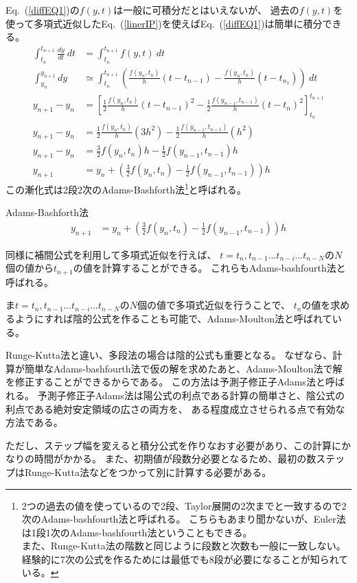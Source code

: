 \documentclass[autodetect-engine,dvipdfmx-if-dvi,ja=standard,a4paper,layout=v2]{bxjsreport}
\newcommand{\eref}[1]{Eq.~(\ref{#1})}
\begin{document}
    \eref{diffEQ1}の$f(y,t)$は一般に可積分だとはいえないが、
    過去の$f(y,t)$を使って多項式近似した\eref{linerIP}を使えば\eref{diffEQ1}は簡単に積分できる。
    \begin{align}
      \int^{t_{n+1}}_{t_n}\frac{dy}{dt}\:dt &= \int^{t_{n+1}}_{t_n}f(y, t)\: dt \nonumber\\
      \int^{y_{n+1}}_{y_n}dy &\simeq \int^{t_{n+1}}_{t_n}\left(\frac{f(y_n,t_n)}{h}(t-t_{n-1}) -
      \frac{f(y_n, t_n)}{h}(t-t_{n_1})\right)\:dt\nonumber\\
      y_{n+1}-y_n &= \left[\frac{1}{2}\frac{f(y_n,t_n)}{h}(t-t_{n-1})^2 -
      \frac{1}{2}\frac{f(y_{n-1}, t_{n-1})}{h}(t-t_{n})^2\right]^{t_{n+1}}_{t_n} \nonumber\\
      y_{n+1}-y_n &=  \frac{1}{2}\frac{f(y_n,t_n)}{h}(3h^2) - \frac{1}{2}\frac{f(y_{n-1}, t_{n-1})}{h}(h^2)\nonumber\\
      y_{n+1}-y_n &=  \frac{3}{2}f(y_n,t_n)h - \frac{1}{2}f(y_{n-1}, t_{n-1})h\nonumber\\
      y_{n+1} &= y_n + \left(\frac{3}{2}f(y_n,t_n) - \frac{1}{2}f(y_{n-1},t_{n-1})\right)h
    \end{align}
    この漸化式は2段2次のAdams-Bashforth法\footnote{
      2つの過去の値を使っているので2段、Taylor展開の2次までと一致するので2次のAdams-bashfourth法と呼ばれる。
      こちらもあまり聞かないが、Euler法は1段1次のAdams-bashfourth法ということもできる。\\
      また、Runge-Kutta法の階数と同じように段数と次数も一般に一致しない。
      経験的に7次の公式を作るためには最低でも8段が必要になることが知られている。
    }と呼ばれる。
    \begin{itembox}[l]{Adams-Bashforth法}
    \begin{align}
      y_{n+1} &= y_n + \left(\frac{3}{2}f(y_n,t_n) - \frac{1}{2}f(y_{n-1},t_{n-1})\right)h\label{ABMethod}
    \end{align}
    \end{itembox}
    同様に補間公式を利用して多項式近似を行えば、
    $t=t_n,t_{n-1}...t_{n-i}...t_{n-N}$の$N$個の値から$t_{n+1}$の値を計算することができる。
    これらもAdams-bashfourth法と呼ばれる。\par
    ま$t=t_n,t_{n-1}...t_{n-i}...t_{n-N}$の$N$個の値で多項式近似を行うことで、
    $t_n$の値を求めるようにすれば陰的公式を作ることも可能で、Adams-Moulton法と呼ばれている。\par
    Runge-Kutta法と違い、多段法の場合は陰的公式も重要となる。
    なぜなら、計算が簡単なAdams-bashfourth法で仮の解を求めたあと、Adams-Moulton法で解を修正することができるからである。
    この方法は予測子修正子Adams法と呼ばれる。
    予測子修正子Adams法は陽公式の利点である計算の簡単さと、陰公式の利点である絶対安定領域の広さの両方を、
    ある程度成立させられる点で有効な方法である。\par
    ただし、ステップ幅を変えると積分公式を作りなおす必要があり、この計算にかなりの時間がかかる。
    また、初期値が段数分必要となるため、最初の数ステップはRunge-Kutta法などをつかって別に計算する必要がある。\par
\end{document}
